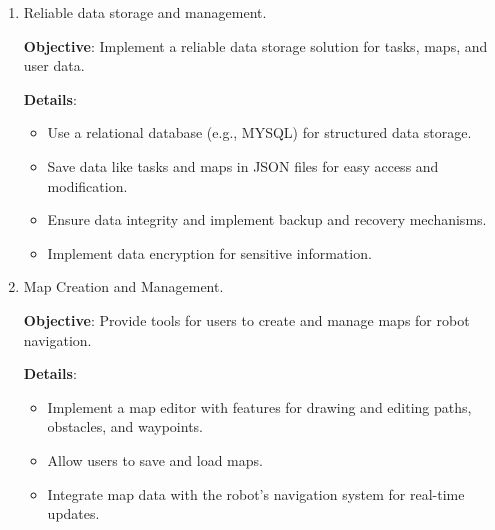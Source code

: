 \begin{enumerate}

    \item Reliable data storage and management.
    
        \vspace{-1.5mm}
        \textbf{Objective}: Implement a reliable data storage solution for tasks, maps, and user data.

        \vspace{-1.5mm}
        \textbf{Details}:
        \begin{itemize}
            \vspace{-1mm}
            \item Use a relational database (e.g., MYSQL) for structured data storage.
            \vspace{-1mm}
            \item Save data like tasks and maps in JSON files for easy access and modification.
            \vspace{-1mm}
            \item Ensure data integrity and implement backup and recovery mechanisms.
            \vspace{-1mm}
            \item Implement data encryption for sensitive information.
        \end{itemize}

    
    \item Map Creation and Management.
    
        \vspace{-1.5mm}
        \textbf{Objective}: Provide tools for users to create and manage maps for robot navigation.

        \vspace{-1.5mm}
        \textbf{Details}:
        \begin{itemize}
            \vspace{-1mm}
            \item Implement a map editor with features for drawing and editing paths, obstacles, and waypoints.
            \vspace{-1mm}
            \item Allow users to save and load maps.
            \vspace{-1mm}
            \item Integrate map data with the robot's navigation system for real-time updates.
        \end{itemize}


\end{enumerate}
